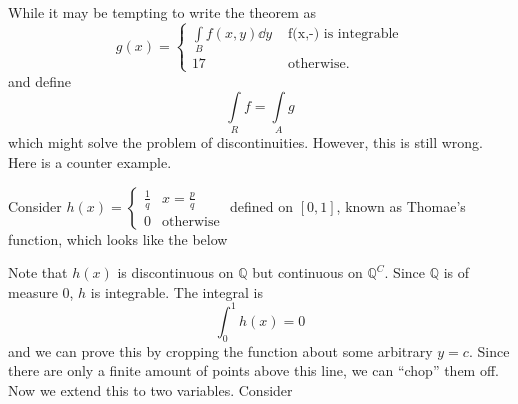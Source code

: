 \documentclass{article}
\numberwithin{equation}{section}
\begin{document}
While it may be tempting to write the theorem as
\begin{equation}
    g(x) = \begin{cases}
        \int\limits_B f(x,y) \dd{y} & \text{ f(x,-) is integrable} \\
        17                          & \text{ otherwise}.
    \end{cases}
\end{equation}
and define
\begin{equation}
    \int\limits_R f = \int\limits_A g
\end{equation}
which might solve the problem of discontinuities. However, this is still wrong. Here is a counter example.

Consider $h(x) = \begin{cases}
        \frac{1}{q} & x = \frac{p}{q}  \\
        0           & \text{otherwise}
    \end{cases}$ defined on $[0,1]$, known as Thomae's function, which looks like the below
\begin{center}
\end{center}
Note that $h(x)$ is discontinuous on $\mathbb{Q}$ but continuous on $\mathbb{Q}^C$. Since $\mathbb{Q}$ is of measure $0$, $h$ is integrable. The integral is
\begin{equation}
    \int_0^1 h(x) = 0
\end{equation}
and we can prove this by cropping the function about some arbitrary $y=c.$ Since there are only a finite amount of points above this line, we can ``chop'' them off. Now we extend this to two variables. Consider
\end{document}
